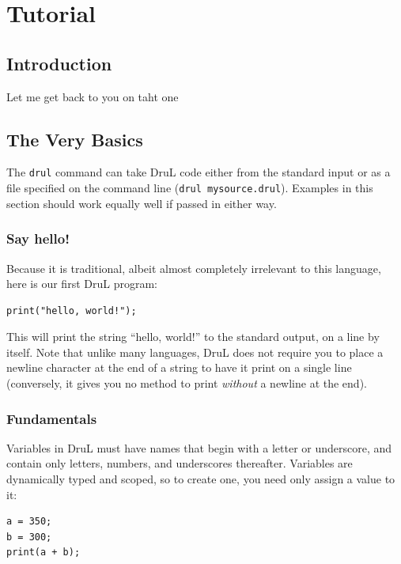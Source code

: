 \chapter{Tutorial}
\section{Introduction}

Let me get back to you on taht one

\section{The Very Basics}

The {\tt drul}  command can take DruL code either from the standard input or as a file specified on the command line ({\tt drul mysource.drul}).  Examples in this section should work equally well if passed in either way.  

\subsection{Say hello!}

Because it is traditional, albeit almost completely irrelevant to this language, here is our first 
DruL program:

\begin{lstlisting}
print("hello, world!");
\end{lstlisting}

This will print the string ``hello, world!'' to the standard output, on a line by itself.  Note that unlike many languages, DruL does not require you to place a newline character at the end of a string to have it print on a single line (conversely, it gives you no method to print \emph{without} a newline at the end).

\subsection{Fundamentals}

Variables in DruL must have names that begin with a letter or underscore, and contain only letters, numbers, and underscores thereafter.  Variables are dynamically typed and scoped, so to create one, you need only assign a value to it:

\begin{lstlisting}
a = 350;
b = 300;
print(a + b);
\end{lstlisting}

